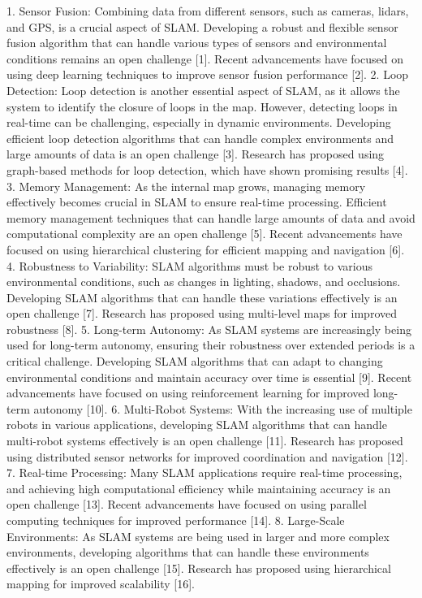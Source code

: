 \documentclass[conference]{IEEEtran}
\begin{document}
1. Sensor Fusion: Combining data from different sensors, such as cameras, lidars, and GPS, is a crucial aspect of SLAM. Developing a robust and flexible sensor fusion algorithm that can handle various types of sensors and environmental conditions remains an open challenge [1]. Recent advancements have focused on using deep learning techniques to improve sensor fusion performance [2].
2. Loop Detection: Loop detection is another essential aspect of SLAM, as it allows the system to identify the closure of loops in the map. However, detecting loops in real-time can be challenging, especially in dynamic environments. Developing efficient loop detection algorithms that can handle complex environments and large amounts of data is an open challenge [3]. Research has proposed using graph-based methods for loop detection, which have shown promising results [4].
3. Memory Management: As the internal map grows, managing memory effectively becomes crucial in SLAM to ensure real-time processing. Efficient memory management techniques that can handle large amounts of data and avoid computational complexity are an open challenge [5]. Recent advancements have focused on using hierarchical clustering for efficient mapping and navigation [6].
4. Robustness to Variability: SLAM algorithms must be robust to various environmental conditions, such as changes in lighting, shadows, and occlusions. Developing SLAM algorithms that can handle these variations effectively is an open challenge [7]. Research has proposed using multi-level maps for improved robustness [8].
5. Long-term Autonomy: As SLAM systems are increasingly being used for long-term autonomy, ensuring their robustness over extended periods is a critical challenge. Developing SLAM algorithms that can adapt to changing environmental conditions and maintain accuracy over time is essential [9]. Recent advancements have focused on using reinforcement learning for improved long-term autonomy [10].
6. Multi-Robot Systems: With the increasing use of multiple robots in various applications, developing SLAM algorithms that can handle multi-robot systems effectively is an open challenge [11]. Research has proposed using distributed sensor networks for improved coordination and navigation [12].
7. Real-time Processing: Many SLAM applications require real-time processing, and achieving high computational efficiency while maintaining accuracy is an open challenge [13]. Recent advancements have focused on using parallel computing techniques for improved performance [14].
8. Large-Scale Environments: As SLAM systems are being used in larger and more complex environments, developing algorithms that can handle these environments effectively is an open challenge [15]. Research has proposed using hierarchical mapping for improved scalability [16].
\end{document}
